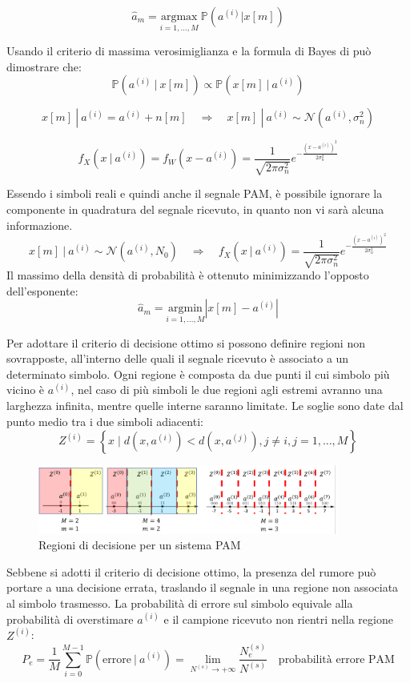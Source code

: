 \[
    \hat{a}_m = \underset{i=1,\ldots,M}{\mathrm{argmax}} \ \mathbb{P}(a^{(i)}|x[m])
\]

Usando il criterio di massima verosimiglianza e la formula di Bayes di può dimostrare che:
\[
    \mathbb{P}(a^{(i)} \ | \ x[m]) \propto  \mathbb{P}(x[m] \ | \ a^{(i)})
\]

\[
    x[m] \ | \ a^{(i)}  = a^{(i)} + n[m] \quad \Rightarrow \quad x[m] \ | \ a^{(i)} \sim \mathcal{N}(a^{(i)}, \sigma_n^2)
\]

\[
    f_X(x \ | \ a^{(i)}) = f_{W}(x - a^{(i)}) = \frac{1}{\sqrt{2\pi \sigma_n^2}} e^{-\frac{(x - a^{(i)})^2}{2\sigma_n^2}}
\]


Essendo i simboli reali e quindi anche il segnale PAM, è possibile ignorare la componente in quadratura del segnale ricevuto, in quanto non vi sarà alcuna informazione.
\[
    x[m] \ | \ a^{(i)} \sim \mathcal{N}(a^{(i)}, N_0) \quad \Rightarrow \quad f_X(x \ | \ a^{(i)}) = \frac{1}{\sqrt{2\pi \sigma_n^2}} e^{-\frac{(x - a^{(i)})^2}{2\sigma_n^2}}
\]
Il massimo della densità di probabilità è ottenuto minimizzando l'opposto dell'esponente:
\[
    \hat{a}_m = \underset{i=1,\ldots,M}{\mathrm{argmin}} \left| x[m] - a^{(i)} \right| 
\]

Per adottare il criterio di decisione ottimo si possono definire regioni non sovrapposte, all'interno delle quali il segnale ricevuto è associato a un determinato simbolo.
Ogni regione è composta da due punti il cui simbolo più vicino è $a^{(i)}$, nel caso di più simboli le due regioni agli estremi avranno una larghezza infinita, mentre quelle interne saranno limitate.
Le soglie sono date dal punto medio tra i due simboli adiacenti:
\[
    Z^{(i)} = \left\{ x \mid d(x, a^{(i)}) < d(x, a^{(j)}), j \neq i, j = 1, \ldots, M \right\}
\]


\begin{figure}[ht]
    \centering
    \includegraphics[width=0.875\textwidth]{imgs/regions.jpg}
    \caption*{Regioni di decisione per un sistema PAM}
\end{figure}





Sebbene si adotti il criterio di decisione ottimo, la presenza del rumore può portare a una decisione errata, traslando il segnale in una regione non associata al simbolo trasmesso.
La probabilità di errore sul simbolo equivale alla probabilità di overstimare $a^{(i)}$ e il campione ricevuto non rientri nella regione $Z^{(i)}$:
\[
    P_e = \frac{1}{M} \sum_{i=0}^{M-1} \mathbb{P}(\text{errore} \ | \ a^{(i)}) = \lim_{N^{(s)} \to +\infty} \frac{N_e^{(s)}}{N^{(s)}} \quad \text{probabilità errore PAM}
\]

